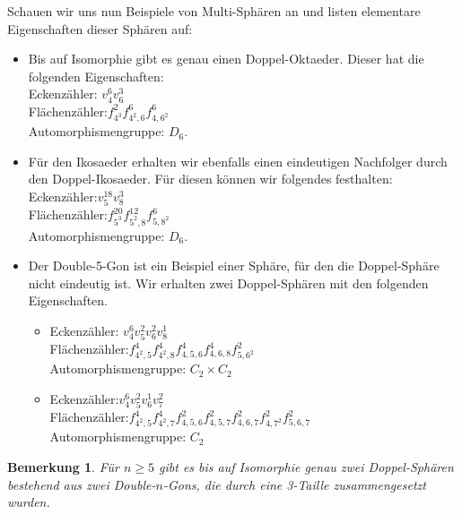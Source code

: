 \documentclass[12pt,titlepage,twoside,cleardoublepage]{article}
\theoremstyle{nummermitklammern}
\newtheorem{bemerkung}[temp]{Bemerkung}
\newtheorem{bemerkung}[zahl]{Bemerkung}
\numberwithin{equation}{section}
\begin{document}
Schauen wir uns nun Beispiele von Multi-Sphären an und listen elementare Eigenschaften dieser Sphären auf:
\begin{itemize}
\item Bis auf Isomorphie gibt es genau einen Doppel-Oktaeder. Dieser hat die folgenden Eigenschaften:\\
Eckenzähler: $v_4^6v_6^3$\\
Flächenzähler:$f_{4^3}^2f_{4^2,6}^6f_{4,6^2}^6$\\
Automorphismengruppe: $D_6.$\\ 
\item Für den Ikosaeder erhalten wir ebenfalls einen eindeutigen Nachfolger durch den Doppel-Ikosaeder. Für diesen können wir folgendes festhalten:\\
Eckenzähler:$v_5^{18}v_8^3$\\
Flächenzähler:$f_{5^3}^{20}f_{5^2,8}^{12}f^6_{5,8^2}$\\
Automorphismengruppe: $D_6.$\\
\item 
Der Double-5-Gon ist ein Beispiel einer Sphäre, für den die Doppel-Sphäre nicht eindeutig ist. Wir erhalten zwei Doppel-Sphären mit den folgenden Eigenschaften.\\
\begin{itemize}
\item Eckenzähler: $v_4^6v_5^2v_6^2v_8^1$\\
Flächenzähler:$f_{4^2,5}^4f^4_{4^2,8}f^4_{4,5,6}f^4_{4,6,8}f^2_{5,6^2}$\\
Automorphismengruppe: $C_2\times C_2$\\
\item 
Eckenzähler:$v_4^6v_5^2v_6^1v_7^2$\\
Flächenzähler:$f_{4^2,5}^4f^4_{4^2,7}f^2_{4,5,6}f^2_{4,5,7}f^2_{4,6,7}f^2_{4,7^2}f^2_{5,6,7}$\\
Automorphismengruppe: $C_2$\\
\end{itemize}
\end{itemize}
\begin{bemerkung}
Für $n\geq 5$ gibt es bis auf Isomorphie genau zwei Doppel-Sphären bestehend aus zwei Double-$n$-Gons, die durch eine 3-Taille zusammengesetzt wurden.
\end{bemerkung}
\end{document}
